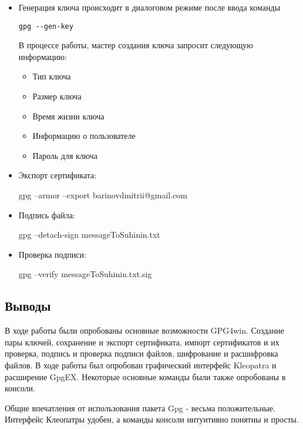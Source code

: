 \documentclass[a4paper, 12pt]{article}
\begin{document}
\begin{itemize}


\item Генерация ключа происходит в диалоговом режиме после ввода команды

\begin{verbatim}
gpg --gen-key
\end{verbatim}

В процессе работы, мастер создания ключа запросит следующую информацию:

\begin{itemize}
\item{Тип ключа}
\item{Размер ключа}
\item{Время жизни ключа}
\item{Информацию о пользователе}
\item{Пароль для ключа}
\end{itemize}

\item Экспорт сертификата:

gpg --armor --export barinovdmitrii@gmail.com

\item Подпись файла:

gpg --detach-sign messageToSuhinin.txt

\item Проверка подписи:

gpg --verify messageToSuhinin.txt.sig


\end{itemize}

\subsection{Выводы}

В ходе работы были опробованы основные возможности GPG4win. Создание пары ключей, сохранение и экспорт сертификата, импорт сертификатов и их проверка, подпись и проверка подписи файлов, шифрование и расшифровка файлов. В ходе работы был опробован графический интерфейс Kleopatra и расширение GpgEX. Некоторые основные команды были также опробованы в консоли.

Общие впечатления от использования пакета Gpg - весьма положительные. Интерфейс Клеопатры удобен, а команды консоли интуитивно понятны и просты. 
\end{document}

